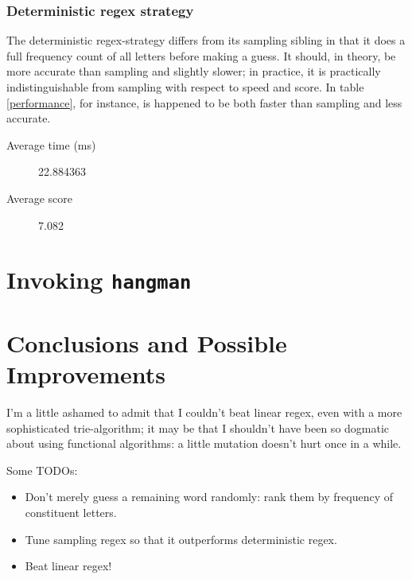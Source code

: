 \documentclass{article}
\begin{document}
\subsubsection{Deterministic regex strategy}

The deterministic regex-strategy differs from its sampling sibling in
that it does a full frequency count of all letters before making a
guess. It should, in theory, be more accurate than sampling and
slightly slower; in practice, it is practically indistinguishable from
sampling with respect to speed and score. In table \ref{performance},
for instance, is happened to be both faster than sampling and less
accurate.

\begin{description}
  \item [Average time (ms)] 22.884363
  \item [Average score] 7.082
\end{description}

\section{Invoking \texttt{hangman}}
\section{Conclusions and Possible Improvements}

I'm a little ashamed to admit that I couldn't beat linear regex, even
with a more sophisticated trie-algorithm; it may be that I shouldn't
have been so dogmatic about using functional algorithms: a little
mutation doesn't hurt once in a while.

Some TODOs:

\begin{itemize}
\item Don't merely guess a remaining word randomly: rank them by
  frequency of constituent letters.
\item Tune sampling regex so that it outperforms deterministic regex.
\item Beat linear regex!
\end{itemize}
\end{document}
